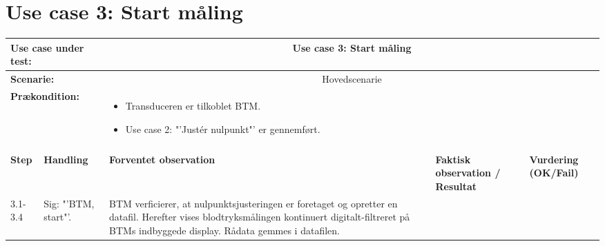 \section{Use case 3: Start måling}

\begin{tabular}{|p{1cm}|p{3cm}|p{4cm}|p{4cm}|p{2cm}|}
\hline
\multicolumn{2}{|p{3cm}|}{\textbf{Use case under test:}} & \multicolumn{3}{c|}{Use case 3: Start måling} \\\hline

\multicolumn{2}{|p{3cm}|}{\textbf{Scenarie:}} & \multicolumn{3}{c|}{Hovedscenarie} \\\hline

\multicolumn{2}{|p{3cm}|}{\textbf{Prækondition:}}  & \multicolumn{3}{l|}{\parbox{0.6\textwidth}{
\begin{itemize}[label=$\circ$]
\item Transduceren er tilkoblet BTM.
\item Use case 2: "'Justér nulpunkt"' er gennemført.  
\end{itemize} }}\\\hline

\multicolumn{5}{|c|}{} \\\hline

\textbf{Step} & \textbf{Handling} & \textbf{Forventet observation} & \textbf{Faktisk observation / Resultat} & \textbf{Vurdering (OK/Fail)}\\\hline

3.1-3.4 & Sig: "'BTM, start"'. & BTM verficierer, at nulpunktsjusteringen er foretaget og opretter en datafil. Herefter vises blodtryksmålingen kontinuert digitalt-filtreret på BTMs indbyggede display. Rådata gemmes i datafilen. &  & \\\hline

\end{tabular}



